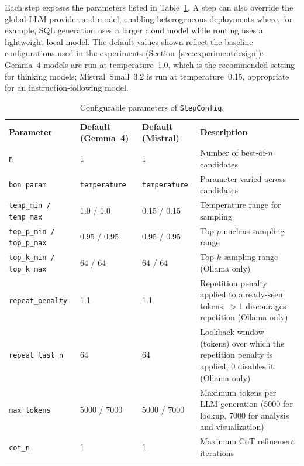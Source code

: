 Each step exposes the parameters listed in Table~\ref{tab:stepconfig}. A step can
also override the global LLM provider and model, enabling heterogeneous deployments
where, for example, SQL generation uses a larger cloud model while routing uses a
lightweight local model.
The default values shown reflect the baseline configurations used in the experiments
(Section~\ref{sec:experimentdesign}): Gemma~4 models are run at temperature~1.0, which
is the recommended setting for thinking models; Mistral~Small~3.2 is run at
temperature~0.15, appropriate for an instruction-following model.

\begin{table}[H]
\centering
\begin{tabular}{|l|l|l|p{4.5cm}|}
\arrayrulecolor{black}\hline
\rowcolor{bluePoli!30}
\textbf{Parameter} & \textbf{Default (Gemma~4)} & \textbf{Default (Mistral)} & \textbf{Description} \T\B \\
\arrayrulecolor{black}\hline
\texttt{n} & 1 & 1 & Number of best-of-$n$ candidates \T\B \\
\hline
\texttt{bon\_param} & \texttt{temperature} & \texttt{temperature} & Parameter varied across candidates \T\B \\
\hline
\texttt{temp\_min / temp\_max} & 1.0 / 1.0 & 0.15 / 0.15 & Temperature range for sampling \T\B \\
\hline
\texttt{top\_p\_min / top\_p\_max} & 0.95 / 0.95 & 0.95 / 0.95 & Top-$p$ nucleus sampling range \T\B \\
\hline
\texttt{top\_k\_min / top\_k\_max} & 64 / 64 & 64 / 64 & Top-$k$ sampling range (Ollama only) \T\B \\
\hline
\texttt{repeat\_penalty} & 1.1 & 1.1 & Repetition penalty applied to already-seen tokens; $>1$ discourages repetition (Ollama only) \T\B \\
\hline
\texttt{repeat\_last\_n} & 64 & 64 & Lookback window (tokens) over which the repetition penalty is applied; 0 disables it (Ollama only) \T\B \\
\hline
\texttt{max\_tokens} & 5000 / 7000 & 5000 / 7000 & Maximum tokens per LLM generation (5000 for lookup, 7000 for analysis and visualization) \T\B \\
\hline
\texttt{cot\_n} & 1 & 1 & Maximum CoT refinement iterations \T\B \\
\hline
\end{tabular}
\caption{Configurable parameters of \texttt{StepConfig}.}
\label{tab:stepconfig}
\end{table}

